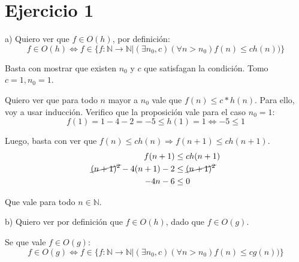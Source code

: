 \documentclass[11pt, spanish]{article}
\begin{document}
\section*{Ejercicio 1}

%
%

%
%
\vspace{1em}
a) Quiero ver que $f \in O(h)$, por definición:
\[
f \in  O(h) \iff f \in \{f : \mathbb{N} \to \mathbb{N} | (\exists n_0, c)(\forall n > n_0) f(n) \leq ch(n)) \}
\] 

Basta con mostrar que existen $n_0$ y $c$ que satisfagan la condición. Tomo $c=1, n_0=1$.

Quiero ver que para todo $n$ mayor a $n_0$ vale que $f(n) \leq c*h(n)$. Para ello, voy a usar inducción. Verifico que la proposición vale para el caso $n_0=1$:
\[ 
f(1) = 1 - 4 - 2 = -5 \leq h(1) = 1 \iff -5 \leq 1
\]

Luego, basta con ver que $f(n) \leq ch(n) \Rightarrow f(n+1) \leq ch(n+1)$.
\begin{equation*}\begin{split}
f(n+1) &\leq ch(n+1)\\
\cancel{(n+1)^2} - 4(n+1) - 2 &\leq \cancel{(n+1)^2}\\
-4n - 6 &\leq 0
\end{split}\end{equation*}

Que vale para todo $n \in \mathbb{N}$.

%
%
\vspace{1em}
b) Quiero ver por definición que $f \in O(h)$, dado que $f \in O(g)$.

Se que vale $f \in  O(g)$:
\[
f \in  O(g) \iff f \in \{f : \mathbb{N} \to \mathbb{N} | (\exists n_0, c)(\forall n > n_0) f(n) \leq cg(n)) \}
\]
\end{document}
